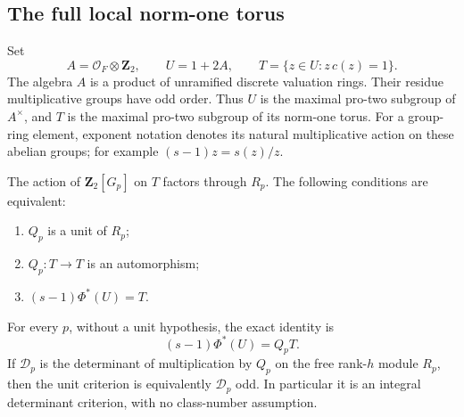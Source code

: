 \subsection{The full local norm-one torus}

Set
\begin{equation}
 A=\mathcal O_F\otimes\mathbf Z_2,\qquad
 U=1+2A,\qquad
 T=\{z\in U:z\,c(z)=1\}.                                \label{eq:cm-type-6}
\end{equation}
The algebra \(A\) is a product of unramified discrete valuation
rings. Their residue multiplicative groups have odd order. Thus
\(U\) is the maximal pro-two subgroup of \(A^\times\), and
\(T\) is the maximal pro-two subgroup of its norm-one torus.
For a group-ring element, exponent notation denotes its natural
multiplicative action on these abelian groups; for example
\((s-1)z=s(z)/z\).

\begin{theorem}\label{thm:cm-type-torus-unit}
The action of \(\mathbf Z_2[G_p]\) on \(T\) factors through
\(R_p\). The following conditions are equivalent:
\begin{enumerate}
\item \(Q_p\) is a unit of \(R_p\);
\item \(Q_p:T\longrightarrow T\) is an automorphism;
\item \((s-1)\Phi^*(U)=T\).
\end{enumerate}
For every \(p\), without a unit hypothesis, the exact identity is
\begin{equation}
                     (s-1)\Phi^*(U)=Q_pT.               \label{eq:cm-type-7}
\end{equation}
If \(\mathcal D_p\) is the determinant of multiplication by
\(Q_p\) on the free rank-\(h\) module \(R_p\), then the
unit criterion is equivalently \(\mathcal D_p\) odd. In particular
it is an integral determinant criterion, with no class-number
assumption.
\end{theorem}

